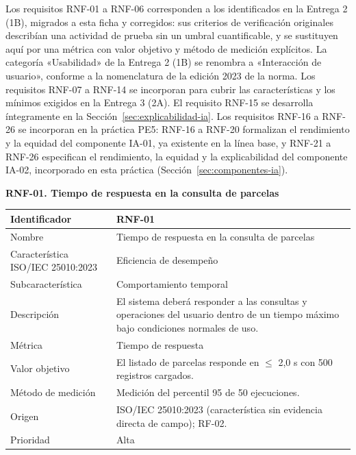 \documentclass[12pt,a4paper]{article}
\begin{document}
Los requisitos RNF-01 a RNF-06 corresponden a los identificados en la Entrega 2 (1B), migrados a esta ficha y corregidos: sus criterios de verificación originales describían una actividad de prueba sin un umbral cuantificable, y se sustituyen aquí por una métrica con valor objetivo y método de medición explícitos. La categoría «Usabilidad» de la Entrega 2 (1B) se renombra a «Interacción de usuario», conforme a la nomenclatura de la edición 2023 de la norma. Los requisitos RNF-07 a RNF-14 se incorporan para cubrir las características y los mínimos exigidos en la Entrega 3 (2A). El requisito RNF-15 se desarrolla íntegramente en la Sección~\ref{sec:explicabilidad-ia}. Los requisitos RNF-16 a RNF-26 se incorporan en la práctica PE5: RNF-16 a RNF-20 formalizan el rendimiento y la equidad del componente IA-01, ya existente en la línea base, y RNF-21 a RNF-26 especifican el rendimiento, la equidad y la explicabilidad del componente IA-02, incorporado en esta práctica (Sección~\ref{sec:componentes-ia}).

\begin{minipage}{\linewidth}
\bigskip
\noindent\textbf{RNF-01. Tiempo de respuesta en la consulta de parcelas}
\label{tab:RNF-01}

\begin{center}
\begin{tabular}{|p{4.2cm}|p{10cm}|}
\hline
Identificador & RNF-01 \\
\hline
Nombre & Tiempo de respuesta en la consulta de parcelas \\
\hline
Característica ISO/IEC 25010:2023 & Eficiencia de desempeño \\
\hline
Subcaracterística & Comportamiento temporal \\
\hline
Descripción & El sistema deberá responder a las consultas y operaciones del usuario dentro de un tiempo máximo bajo condiciones normales de uso. \\
\hline
Métrica & Tiempo de respuesta \\
\hline
Valor objetivo & El listado de parcelas responde en $\leq$ 2,0 s con 500 registros cargados. \\
\hline
Método de medición & Medición del percentil 95 de 50 ejecuciones. \\
\hline
Origen & ISO/IEC 25010:2023 (característica sin evidencia directa de campo); RF-02. \\
\hline
Prioridad & Alta \\
\hline
\end{tabular}
\end{center}
\end{minipage}
\end{document}

